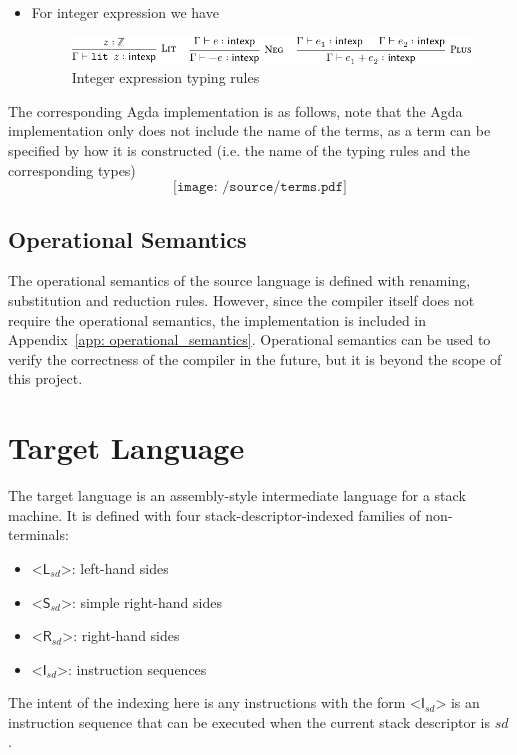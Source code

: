 \documentclass[12pt,a4paper]{report}
\theoremstyle{definition}
\newcommand{\bracket}[1]{\mathord{<} #1 \mathord{>}}
\begin{document}
\begin{itemize}
\begin{figure}[H]
                    \label{fig: rule_comm}
                \end{figure}
            \item For integer expression we have
                \begin{figure}[H]
                    \centering
                    \includegraphics{source_terms_intexp.pdf}
                    \caption{Integer expression typing rules}
                    \label{fig: rule_intexp}
                \end{figure}
        \end{itemize}

        The corresponding Agda implementation is as follows, note that the Agda implementation only does not include the name of the terms, as a term can be specified by how it is constructed (i.e. the name of the typing rules and the corresponding types)
        \[\texttt{[image: /source/terms.pdf]}\]

        \subsection{Operational Semantics}
        The operational semantics of the source language is defined with renaming, substitution and reduction rules. However, since the compiler itself does not require the operational semantics, the implementation is included in Appendix~\ref{app: operational_semantics}. Operational semantics can be used to verify the correctness of the compiler in the future, but it is beyond the scope of this project.


    \section{Target Language}
    The target language is an assembly-style intermediate language for a stack machine. It is defined with four stack-descriptor-indexed families of non-terminals: 
    \begin{itemize}
        \item 
            $\bracket{\textsf{L}_{sd}}$: left-hand sides
        \item 
            $\bracket{\textsf{S}_{sd}}$: simple right-hand sides
        \item
            $\bracket{\textsf{R}_{sd}}$: right-hand sides
        \item
            $\bracket{\textsf{I}_{sd}}$: instruction sequences
    \end{itemize}
    The intent of the indexing here is any instructions with the form $\bracket{\textsf{I}_{sd}}$ is an instruction sequence that can be executed when the current stack descriptor is $sd$. 
\end{document}
